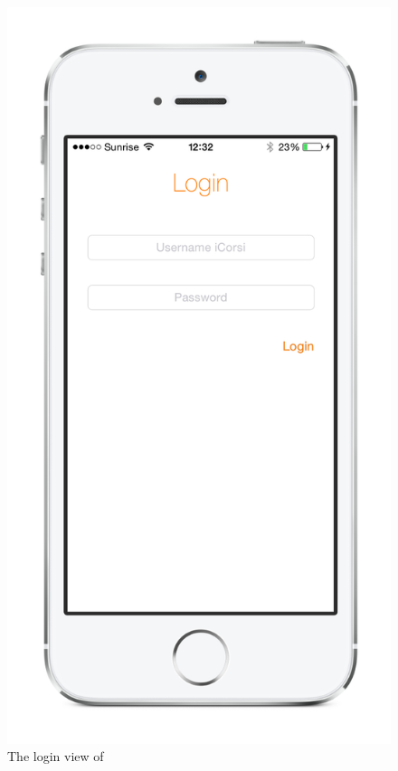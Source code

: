 \begin{figure}[htbp]
\begin{center}
\includegraphics[scale=0.5]{img/iphone_login.png}
\caption{The login view of \UB\ }
\label{loginview}
\end{center}
\end{figure}

